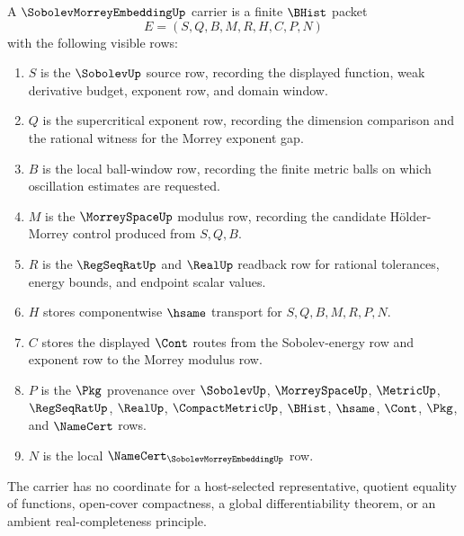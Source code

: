 \begin{definition}
\label{def:sobolev-morrey-embedding-carrier}
A $\SobolevMorreyEmbeddingUp$ carrier is a finite $\BHist$ packet
$$
E=(S,Q,B,M,R,H,C,P,N)
$$
with the following visible rows:
\begin{enumerate}
\item $S$ is the $\SobolevUp$ source row, recording the displayed function, weak derivative budget, exponent row, and domain window.
\item $Q$ is the supercritical exponent row, recording the dimension comparison and the rational witness for the Morrey exponent gap.
\item $B$ is the local ball-window row, recording the finite metric balls on which oscillation estimates are requested.
\item $M$ is the $\MorreySpaceUp$ modulus row, recording the candidate Hölder-Morrey control produced from $S,Q,B$.
\item $R$ is the $\RegSeqRatUp$ and $\RealUp$ readback row for rational tolerances, energy bounds, and endpoint scalar values.
\item $H$ stores componentwise $\hsame$ transport for $S,Q,B,M,R,P,N$.
\item $C$ stores the displayed $\Cont$ routes from the Sobolev-energy row and exponent row to the Morrey modulus row.
\item $P$ is the $\Pkg$ provenance over $\SobolevUp$, $\MorreySpaceUp$, $\MetricUp$, $\RegSeqRatUp$, $\RealUp$, $\CompactMetricUp$, $\BHist$, $\hsame$, $\Cont$, $\Pkg$, and $\NameCert$ rows.
\item $N$ is the local $\NameCert_{\SobolevMorreyEmbeddingUp}$ row.
\end{enumerate}
The carrier has no coordinate for a host-selected representative, quotient equality of functions, open-cover compactness, a global differentiability theorem, or an ambient real-completeness principle.
\end{definition}

